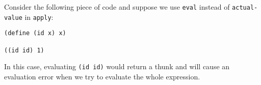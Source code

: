 \documentclass[a4paper,12pt]{article}
\begin{document}
Consider the following piece of code and suppose we use
\lstinline!eval! instead of \lstinline!actual-value! in \lstinline!apply!:

\begin{lstlisting}
(define (id x) x)

((id id) 1)
\end{lstlisting}

In this case, evaluating \lstinline!(id id)! would return a thunk and
will cause an evaluation error when we try to evaluate the whole expression.
\end{document}

